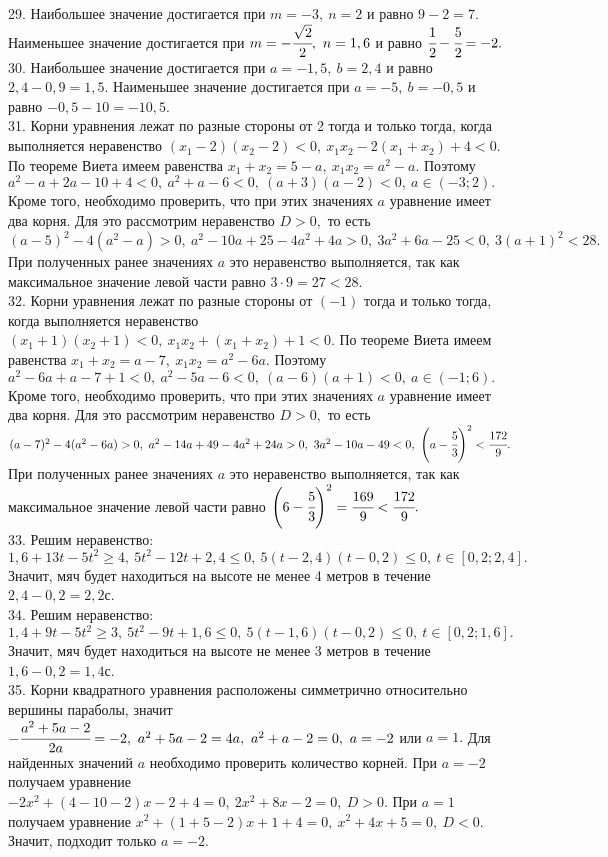 29. Наибольшее значение достигается при $m=-3,\ n=2$ и равно $9-2=7.$ Наименьшее значение достигается при $m=-\cfrac{\sqrt{2}}{2},\ n=1,6$ и равно $\cfrac{1}{2}-\cfrac{5}{2}=-2.$\\
30. Наибольшее значение достигается при $a=-1,5,\ b=2,4$ и равно $2,4-0,9=1,5.$ Наименьшее значение достигается при $a=-5,\ b=-0,5$ и равно $-0,5-10=-10,5.$\\
31. Корни уравнения лежат по разные стороны от 2 тогда и только тогда, когда выполняется неравенство $(x_1-2)(x_2-2)<0,\ x_1x_2-2(x_1+x_2)+4<0.$ По теореме Виета имеем равенства $x_1+x_2=5-a,\ x_1x_2=a^2-a.$ Поэтому $a^2-a+2a-10+4<0,\
a^2+a-6<0,\ (a+3)(a-2)<0,\ a\in(-3;2).$ Кроме того, необходимо проверить, что при этих значениях $a$ уравнение имеет два корня. Для это рассмотрим неравенство $D>0,$ то есть $(a-5)^2-4(a^2-a)>0,\ a^2-10a+25-4a^2+4a>0,\ 3a^2+6a-25<0,\ 3(a+1)^2<28.$ При полученных ранее значениях $a$ это неравенство выполняется, так как максимальное значение левой части равно $3\cdot9=27<28.$\\
32. Корни уравнения лежат по разные стороны от $(-1)$ тогда и только тогда, когда выполняется неравенство $(x_1+1)(x_2+1)<0,\ x_1x_2+(x_1+x_2)+1<0.$ По теореме Виета имеем равенства $x_1+x_2=a-7,\ x_1x_2=a^2-6a.$ Поэтому $a^2-6a+a-7+1<0,\ a^2-5a-6<0,\ (a-6)(a+1)<0,\ a\in(-1;6).$ Кроме того, необходимо проверить, что при этих значениях $a$ уравнение имеет два корня. Для это рассмотрим неравенство $D>0,$ то есть $(a-7)^2-4(a^2-6a)>0,\ a^2-14a+49-4a^2+24a>0,\ 3a^2-10a-49<0,\ \left(a-\cfrac{5}{3}\right)^2<\cfrac{172}{9}.$ При полученных ранее значениях $a$ это неравенство выполняется, так как максимальное значение левой части равно $\left(6-\cfrac{5}{3}\right)^2=\cfrac{169}{9}<\cfrac{172}{9}.$\\
33. Решим неравенство: $1,6+13t-5t^2\geqslant4,\ 5t^2-12t+2,4\leqslant0,\ 5(t-2,4)(t-0,2)\leqslant0,\ t\in[0,2;2,4].$ Значит, мяч будет находиться на высоте не менее 4 метров в течение $2,4-0,2=2,2$с.\\
34. Решим неравенство: $1,4+9t-5t^2\geqslant3,\ 5t^2-9t+1,6\leqslant0,\ 5(t-1,6)(t-0,2)\leqslant0,\ t\in[0,2;1,6].$ Значит, мяч будет находиться на высоте не менее 3 метров в течение $1,6-0,2=1,4$с.\\
35. Корни квадратного уравнения расположены симметрично относительно вершины параболы, значит $-\cfrac{a^2+5a-2}{2a}=-2,\ a^2+5a-2=4a,\ a^2+a-2=0,\ a=-2$ или $a=1.$ Для найденных значений $a$ необходимо проверить количество корней. При $a=-2$ получаем уравнение $-2x^2+(4-10-2)x-2+4=0,\ 2x^2+8x-2=0,\ D>0.$ При $a=1$ получаем уравнение $x^2+(1+5-2)x+1+4=0,\ x^2+4x+5=0,\ D<0.$ Значит, подходит только $a=-2.$\\
